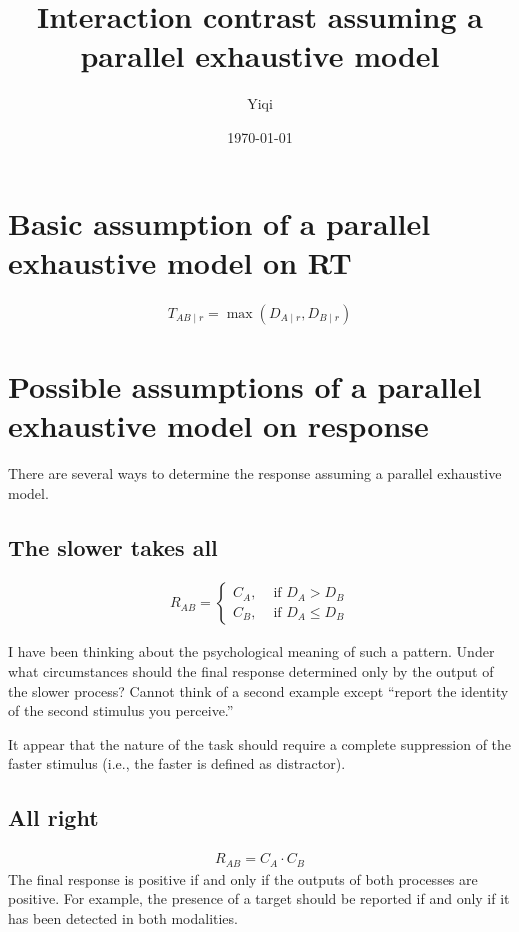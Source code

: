 \documentclass[a4paper,12pt]{article}
\title{Interaction contrast assuming a parallel exhaustive model}
\author{Yiqi}
\date{\today}
\begin{document}
\maketitle

\vspace{24pt}

\section{Basic assumption of a parallel exhaustive model on RT}
\begin{align*}
T_{AB \mid r} = \max(D_{A \mid r},D_{B \mid r})
\end{align*}
\par

\section{Possible assumptions of a parallel exhaustive model on response}
There are several ways to determine the response assuming a parallel exhaustive model.

\subsection{The slower takes all}
\begin{align*}
R_{AB}=
\begin{cases}
C_A, & \text{ if } D_A>D_B \\
C_B, & \text{ if } D_A \leq D_B
\end{cases}
\end{align*}

I have been thinking about the psychological meaning of such a pattern. Under what circumstances should the final response determined only by the output of the slower process? Cannot think of a second example except ``report the identity of the second stimulus you perceive.''\par
It appear that the nature of the task should require a complete suppression of the faster stimulus (i.e., the faster is defined as distractor).

\subsection{All right}
\begin{align*}
R_{AB}=C_A \cdot C_B
\end{align*}
The final response is positive if and only if the outputs of both processes are positive. For example, the presence of a target should be reported if and only if it has been detected in both modalities.
\end{document}
